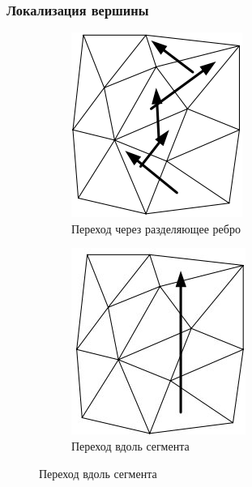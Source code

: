 \documentclass[10pt, unicode]{beamer}
\begin{document}
    \begin{frame}
        \frametitle{Локализация вершины}
        \begin{figure}[H]
            \centering
            \begin{subfigure}{0.49\linewidth}
                \centering
                \includegraphics[scale=0.5]{SeparatingEdge.png}
                \caption{Переход через разделяющее ребро}
            \end{subfigure}
            \begin{subfigure}{0.49\linewidth}
                \centering
                \includegraphics[scale=0.5]{ThrougSegmentIntersection.jpg}
                \caption{Переход вдоль сегмента}
            \end{subfigure}
        \end{figure}
    \end{frame}
\end{document}
